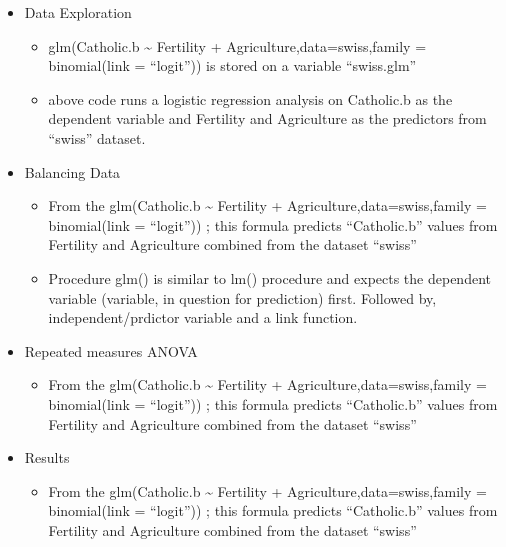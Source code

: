 \documentclass[]{article}
\providecommand{\tightlist}{%
  \setlength{\itemsep}{0pt}\setlength{\parskip}{0pt}}
\begin{document}
\begin{itemize}
\tightlist
\item
  Data Exploration

  \begin{itemize}
  \tightlist
  \item
    glm(Catholic.b \textasciitilde{} Fertility +
    Agriculture,data=swiss,family = binomial(link = ``logit'')) is
    stored on a variable ``swiss.glm''
  \item
    above code runs a logistic regression analysis on Catholic.b as the
    dependent variable and Fertility and Agriculture as the predictors
    from ``swiss'' dataset.
  \end{itemize}
\item
  Balancing Data

  \begin{itemize}
  \tightlist
  \item
    From the glm(Catholic.b \textasciitilde{} Fertility +
    Agriculture,data=swiss,family = binomial(link = ``logit'')) ; this
    formula predicts ``Catholic.b'' values from Fertility and
    Agriculture combined from the dataset ``swiss''
  \item
    Procedure glm() is similar to lm() procedure and expects the
    dependent variable (variable, in question for prediction) first.
    Followed by, independent/prdictor variable and a link function.
  \end{itemize}
\item
  Repeated measures ANOVA

  \begin{itemize}
  \tightlist
  \item
    From the glm(Catholic.b \textasciitilde{} Fertility +
    Agriculture,data=swiss,family = binomial(link = ``logit'')) ; this
    formula predicts ``Catholic.b'' values from Fertility and
    Agriculture combined from the dataset ``swiss''
  \end{itemize}
\item
  Results

  \begin{itemize}
  \tightlist
  \item
    From the glm(Catholic.b \textasciitilde{} Fertility +
    Agriculture,data=swiss,family = binomial(link = ``logit'')) ; this
    formula predicts ``Catholic.b'' values from Fertility and
    Agriculture combined from the dataset ``swiss''
  \end{itemize}
\end{itemize}
\end{document}
